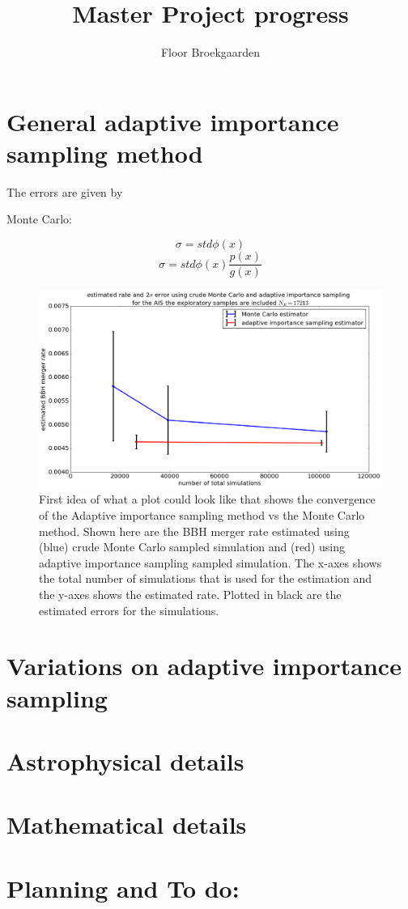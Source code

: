 \documentclass[11pt,a4paper]{report}
\author{Floor Broekgaarden}
\title{Master Project progress}
\begin{document}
\maketitle





\chapter{General adaptive importance sampling method }





The errors are given by 

Monte Carlo: 

\begin{equation}
	\sigma = std{\phi(x)}
	\label{eq:MC-error}
\end{equation}
%
\begin{equation}
	\sigma = std{\phi(x) \frac{p(x)}{g(x)}}
	\label{eq:AIS-error}
\end{equation}
%



\begin{figure}
	\includegraphics[width=\columnwidth]{bbhrate_error_evolution.png}
    \caption{First idea of what a plot could look like that shows the convergence of the Adaptive importance sampling method vs the Monte Carlo method. Shown here are the BBH merger rate estimated using (blue) crude Monte Carlo sampled simulation and (red) using adaptive importance sampling sampled simulation. The x-axes shows the total number of simulations that is used for the estimation and the y-axes shows the estimated rate. Plotted in black are the estimated errors for the simulations.}
    \label{fig:aIS_scheme}
\end{figure}
%



\chapter{Variations on adaptive importance sampling}

\chapter{Astrophysical details}

\chapter{Mathematical details}


\chapter{Planning and To do:}
\end{document}
